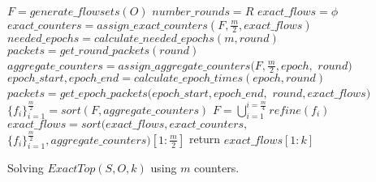 \begin{algorithm}
    $F = generate\_flowsets(O)$\;
    $number\_rounds=R$\;
    $exact\_flows=\phi$\;
    {
        $exact\_counters=assign\_exact\_counters(F, \frac{m}{2}, exact\_flows)$\;
        $needed\_epochs=calculate\_needed\_epochs(m, round)$\;
        $packets=get\_round\_packets(round)$\;
        {
            $aggregate\_counters=assign\_aggregate\_counters(F, \frac{m}{2}, epoch,$
            $    round)$\;
            $epoch\_start, epoch\_end=calculate\_epoch\_times(epoch, round)$\;
            $packets=get\_epoch\_packets(epoch\_start, epoch\_end,$
            $    round, exact\_flows)$\;
            $\{f_i\}^{\frac{m}{2}}_{i=1}=sort(F, aggregate\_counters)$\;
            $F=\bigcup_{i=1}^{i=\frac{m}{4}}refine(f_i)$\;
        }
        $exact\_flows=sort(exact\_flows, exact\_counters,$
         $\{f_i\}^{\frac{m}{2}}_{i=1}, aggregate\_counters)[1:\frac{m}{2}]$\;
    }
    return $exact\_flows[1:k]$\;
    \caption{Solving $ExactTop(S,O,k)$ using $m$ counters.}
    \label{algo:MultiRound}
\end{algorithm}
